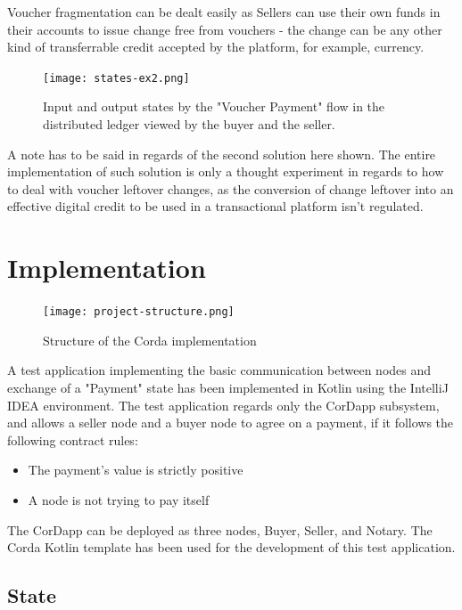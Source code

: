 Voucher fragmentation can be dealt easily as Sellers can use their own funds in their accounts to issue change free from vouchers - the change can be any other kind of transferrable credit accepted by the platform, for example, currency.

\begin{figure}[h!]
    \centering
    \texttt{[image: states-ex2.png]}
    \caption{
       Input and output states by the "Voucher Payment" flow in the distributed ledger viewed by the buyer and the seller.
        }
\end{figure}

A note has to be said in regards of the second solution here shown. The entire implementation of such solution is only a thought experiment in regards to how to deal with voucher leftover changes, as the conversion of change leftover into an effective digital credit to be used in a transactional platform isn't regulated.


\section{Implementation}

\begin{figure}[h!]
    \centering
    \texttt{[image: project-structure.png]}
    \caption{
       Structure of the Corda implementation
        }
\end{figure}

A test application implementing the basic communication between nodes and exchange of a "Payment" state has been implemented in Kotlin using the IntelliJ IDEA environment. The test application regards only the CorDapp subsystem, and allows a seller node and a buyer node to agree on a payment, if it follows the following contract rules: 

\begin{itemize}
    \item The payment's value is strictly positive
    \item A node is not trying to pay itself
\end{itemize}

The CorDapp can be deployed as three nodes, Buyer, Seller, and Notary.
The Corda Kotlin template has been used for the development of this test application.

\newpage

\subsection{State}

